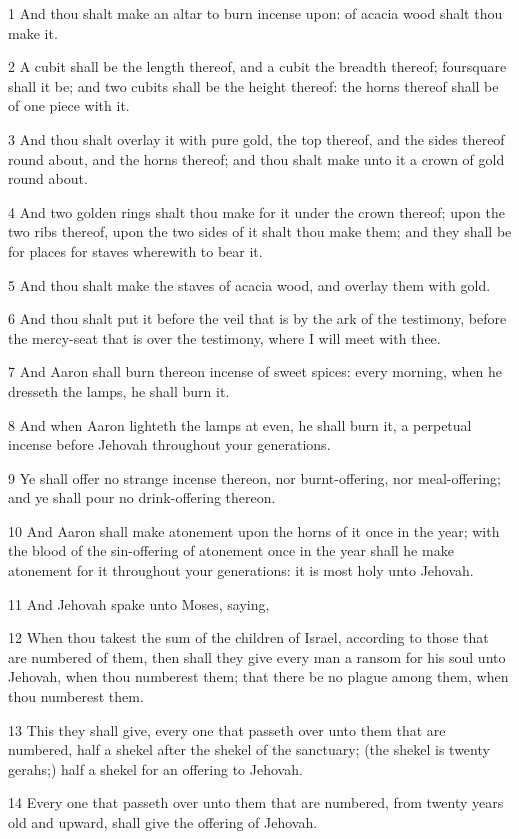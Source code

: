 \par 1 And thou shalt make an altar to burn incense upon: of acacia wood shalt thou make it.
\par 2 A cubit shall be the length thereof, and a cubit the breadth thereof; foursquare shall it be; and two cubits shall be the height thereof: the horns thereof shall be of one piece with it.
\par 3 And thou shalt overlay it with pure gold, the top thereof, and the sides thereof round about, and the horns thereof; and thou shalt make unto it a crown of gold round about.
\par 4 And two golden rings shalt thou make for it under the crown thereof; upon the two ribs thereof, upon the two sides of it shalt thou make them; and they shall be for places for staves wherewith to bear it.
\par 5 And thou shalt make the staves of acacia wood, and overlay them with gold.
\par 6 And thou shalt put it before the veil that is by the ark of the testimony, before the mercy-seat that is over the testimony, where I will meet with thee.
\par 7 And Aaron shall burn thereon incense of sweet spices: every morning, when he dresseth the lamps, he shall burn it.
\par 8 And when Aaron lighteth the lamps at even, he shall burn it, a perpetual incense before Jehovah throughout your generations.
\par 9 Ye shall offer no strange incense thereon, nor burnt-offering, nor meal-offering; and ye shall pour no drink-offering thereon.
\par 10 And Aaron shall make atonement upon the horns of it once in the year; with the blood of the sin-offering of atonement once in the year shall he make atonement for it throughout your generations: it is most holy unto Jehovah.
\par 11 And Jehovah spake unto Moses, saying,
\par 12 When thou takest the sum of the children of Israel, according to those that are numbered of them, then shall they give every man a ransom for his soul unto Jehovah, when thou numberest them; that there be no plague among them, when thou numberest them.
\par 13 This they shall give, every one that passeth over unto them that are numbered, half a shekel after the shekel of the sanctuary; (the shekel is twenty gerahs;) half a shekel for an offering to Jehovah.
\par 14 Every one that passeth over unto them that are numbered, from twenty years old and upward, shall give the offering of Jehovah.
